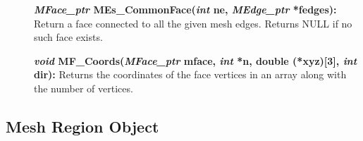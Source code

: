 \documentclass[12pt]{article}
\begin{document}
\begin{description}
\item[]\textbf{\textit{MFace\_ptr} MEs\_CommonFace(\textit{int} ne,
    \textit{MEdge\_ptr} *fedges):} Return a face connected to all
  the given mesh edges. Returns NULL if no such face exists.


\item[]

\item[]\textbf{\textit{void} MF\_Coords(\textit{MFace\_ptr} mface,
\textit{int} *n, double (*xyz)[3], \textit{int} dir):} Returns the
coordinates of the face vertices in an array along with the number of
vertices. 
\end{description}

\newpage
\subsection{Mesh Region Object}
\end{document}

